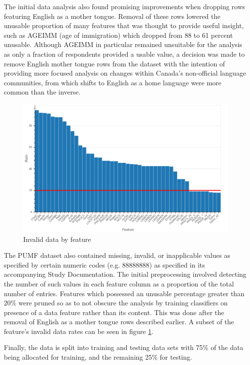 \documentclass[10pt, conference, compsocconf]{IEEEtran}
\begin{document}
The initial data analysis also found promising improvements when dropping rows featuring English as a mother tongue.  Removal of these rows lowered the unusable proportion of many features that was thought to provide useful insight, such as AGEIMM (age of immigration) which dropped from 88 to 61 percent unusable.  Although AGEIMM in particular remained unsuitable for the analysis as only a fraction of respondents provided a usable value, a decision was made to remove English mother tongue rows from the dataset with the intention of providing more focused analysis on changes within Canada's non-official language communities, from which shifts to English as a home language were more common than the inverse.

\begin{figure}
  \includegraphics[scale=0.25]{invalid_data_by_feature}
  \centering
  \caption{Invalid data by feature}
  \label{fig:invalid_data}
\end{figure}

The PUMF dataset also contained missing, invalid, or inapplicable values as specified by certain numeric codes (e.g.  88888888) as specified in its accompanying Study Documentation.  The initial preprocessing involved detecting the number of such values in each feature column as a proportion of the total number of entries.  Features which possessed an unusable percentage greater than 20\% were pruned so as to not obscure the analysis by training classifiers on presence of a data feature rather than its content. This was done after the removal of English as a mother tongue rows described earlier. A subset of the feature's invalid data rates can be seen in figure \ref{fig:invalid_data}.

Finally, the data is split into training and testing data sets with 75\% of the data being allocated for training, and the remaining 25\% for testing.
\end{document}
